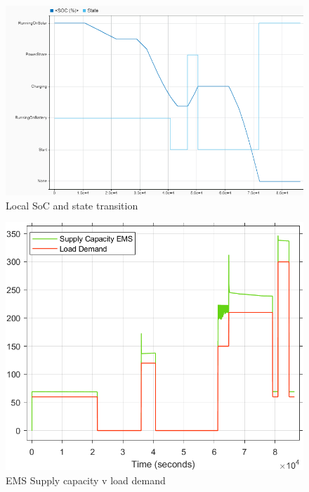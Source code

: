 \begin{figure}[H]
	\centering
	\includegraphics[totalheight=8cm]{Figures/local soc and state transition.png}
	\caption{Local SoC and state transition}
\end{figure}
\begin{figure}[H]
	\centering
	\includegraphics[totalheight=8cm]{Figures/ems supply capacity v load demand1.png}
	\caption{EMS Supply capacity v load demand}
\end{figure}
